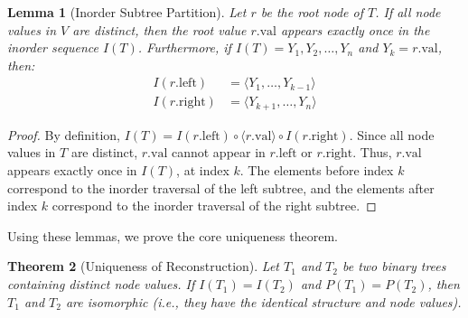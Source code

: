 \documentclass[10pt,journal,compsoc,onecolumn]{IEEEtran}
\newtheorem{theorem}{Theorem}
\newtheorem{lemma}[theorem]{Lemma}
\begin{document}
\begin{lemma}[Inorder Subtree Partition]
\label{lem:partition}
Let $r$ be the root node of $T$. If all node values in $V$ are distinct, then the root value $r.\text{val}$ appears exactly once in the inorder sequence $I(T)$. Furthermore, if $I(T) = Y_1, Y_2, \dots, Y_n$ and $Y_k = r.\text{val}$, then:
\begin{align*}
I(r.\text{left}) &= \langle Y_1, \dots, Y_{k-1} \rangle \\
I(r.\text{right}) &= \langle Y_{k+1}, \dots, Y_n \rangle
\end{align*}
\end{lemma}
\begin{proof}
By definition, $I(T) = I(r.\text{left}) \circ \langle r.\text{val} \rangle \circ I(r.\text{right})$. Since all node values in $T$ are distinct, $r.\text{val}$ cannot appear in $r.\text{left}$ or $r.\text{right}$. Thus, $r.\text{val}$ appears exactly once in $I(T)$, at index $k$. The elements before index $k$ correspond to the inorder traversal of the left subtree, and the elements after index $k$ correspond to the inorder traversal of the right subtree.
\end{proof}

Using these lemmas, we prove the core uniqueness theorem.

\begin{theorem}[Uniqueness of Reconstruction]
Let $T_1$ and $T_2$ be two binary trees containing distinct node values. If $I(T_1) = I(T_2)$ and $P(T_1) = P(T_2)$, then $T_1$ and $T_2$ are isomorphic (i.e., they have the identical structure and node values).
\end{theorem}
\end{document}
